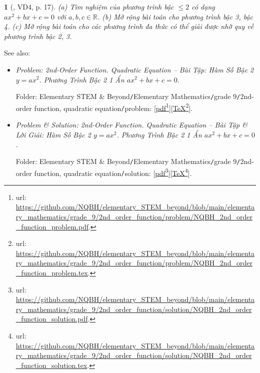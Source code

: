 \documentclass{article}
\newtheorem{baitoan}{}
\begin{document}
\begin{baitoan}[\cite{Doanh_Tuan_Pascal}, VD4, p. 17]
	(a) Tìm nghiệm của phương trình bậc $\le2$ có dạng $ax^2 + bx + c = 0$ với $a,b,c\in\mathbb{R}$. (b) Mở rộng bài toán cho phương trình bậc 3, bậc 4. (c) Mở rộng bài toán cho các phương trình đa thức có thể giải được nhờ quy về phương trình bậc 2, 3.
\end{baitoan}
See also:
\begin{itemize}
	\item {\it Problem: 2nd-Order Function. Quadratic Equation -- Bài Tập: Hàm Số Bậc 2 $y = ax^2$. Phương Trình Bậc 2 1 Ẩn $ax^2 + bx + c = 0$}.
	
	Folder: {\sf Elementary STEM \& Beyond{\tt/}Elementary Mathematics{\tt/}grade 9{\tt/}2nd-order function, quadratic equation{\tt/}problem}: [\href{https://github.com/NQBH/elementary_STEM_beyond/blob/main/elementary_mathematics/grade_9/2nd_order_function/problem/NQBH_2nd_order_function_problem.pdf}{pdf}\footnote{{\sc url}: \url{https://github.com/NQBH/elementary_STEM_beyond/blob/main/elementary_mathematics/grade_9/2nd_order_function/problem/NQBH_2nd_order_function_problem.pdf}.}][\href{https://github.com/NQBH/elementary_STEM_beyond/blob/main/elementary_mathematics/grade_9/2nd_order_function/problem/NQBH_2nd_order_function_problem.tex}{\TeX}\footnote{{\sc url}: \url{https://github.com/NQBH/elementary_STEM_beyond/blob/main/elementary_mathematics/grade_9/2nd_order_function/problem/NQBH_2nd_order_function_problem.tex}.}].
	\item {\it Problem \& Solution: 2nd-Order Function. Quadratic Equation -- Bài Tập \& Lời Giải: Hàm Số Bậc 2 $y = ax^2$. Phương Trình Bậc 2 1 Ẩn $ax^2 + bx + c = 0$}.
	
	Folder: {\sf Elementary STEM \& Beyond{\tt/}Elementary Mathematics{\tt/}grade 9{\tt/}2nd-order function, quadratic equation{\tt/}solution}: [\href{https://github.com/NQBH/elementary_STEM_beyond/blob/main/elementary_mathematics/grade_9/2nd_order_function/solution/NQBH_2nd_order_function_solution.pdf}{pdf}\footnote{{\sc url}: \url{https://github.com/NQBH/elementary_STEM_beyond/blob/main/elementary_mathematics/grade_9/2nd_order_function/solution/NQBH_2nd_order_function_solution.pdf}.}][\href{https://github.com/NQBH/elementary_STEM_beyond/blob/main/elementary_mathematics/grade_9/2nd_order_function/solution/NQBH_2nd_order_function_solution.tex}{\TeX}\footnote{{\sc url}: \url{https://github.com/NQBH/elementary_STEM_beyond/blob/main/elementary_mathematics/grade_9/2nd_order_function/solution/NQBH_2nd_order_function_solution.tex}.}].
\end{itemize}
\end{document}
